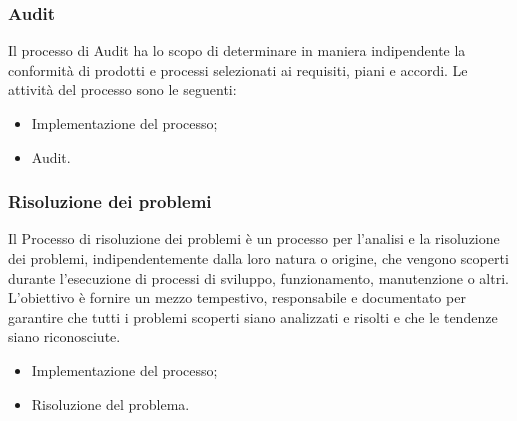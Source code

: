 \subsubsection{Audit}
Il processo di Audit ha lo scopo di determinare in maniera indipendente la conformità di prodotti e processi selezionati ai requisiti, piani e accordi.
Le attività del processo sono le seguenti:
\begin{itemize}
\item Implementazione del processo;
\item Audit.
\end{itemize}

\subsubsection{Risoluzione dei problemi}
Il Processo di risoluzione dei problemi è un processo per l'analisi e la risoluzione dei problemi, indipendentemente dalla loro natura o origine, che vengono scoperti durante l'esecuzione di processi di sviluppo, funzionamento, manutenzione o altri. L'obiettivo è fornire un mezzo tempestivo, responsabile e documentato per garantire che tutti i problemi scoperti siano analizzati e risolti e che le tendenze siano riconosciute.
\begin{itemize}
\item Implementazione del processo;
\item Risoluzione del problema.
\end{itemize}

